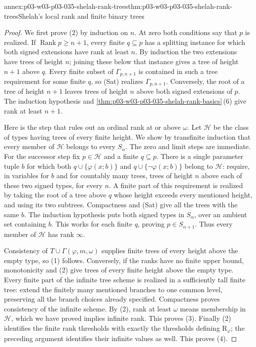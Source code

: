 \begin{annexitem}{annex:p03-w03-p03-035-shelah-rank-trees}{thm:p03-w03-p03-035-shelah-rank-trees}{Shelah's local rank and finite binary trees}
\begin{proof}
We first prove (2) by induction on \(n\).  At zero both conditions say
that \(p\) is realized.  If \(\operatorname{Rank}p\geq n+1\), every finite
\(q\subseteq p\) has a splitting instance for which both signed
extensions have rank at least \(n\).  By induction the two extensions have
trees of height \(n\); joining these below that instance gives a tree of
height \(n+1\) above \(q\).  Every finite subset of \(\Gamma_{p,n+1}\) is
contained in such a tree requirement for some finite \(q\), so (Sat)
realizes \(\Gamma_{p,n+1}\).  Conversely, the root of a tree of height
\(n+1\) leaves trees of height \(n\) above both signed extensions of
\(p\).  The induction hypothesis and
\cref{thm:p03-w03-p03-035-shelah-rank-basics}\,(6) give rank at least
\(n+1\).

Here is the step that rules out an ordinal rank at or above \(\omega\).
Let \(\mathcal H\) be the class of types having trees of every finite
height.  We show by transfinite induction that every member of
\(\mathcal H\) belongs to every \(S_\alpha\).  The zero and limit steps
are immediate.  For the successor step fix \(p\in\mathcal H\) and a
finite \(q\subseteq p\).  There is a single parameter tuple \(b\) for
which both \(q\cup\{\varphi(x;b)\}\) and
\(q\cup\{\neg\varphi(x;b)\}\) belong to \(\mathcal H\): require, in
variables for \(b\) and for countably many trees, trees of height \(n\)
above each of these two signed types, for every \(n\).  A finite part of
this requirement is realized by taking the root of a tree above \(q\)
whose height exceeds every mentioned height, and using its two subtrees.
Compactness and (Sat) give all the trees with the same \(b\).  The
induction hypothesis puts both signed types in \(S_\alpha\), over an
ambient set containing \(b\).  This works for each finite \(q\), proving
\(p\in S_{\alpha+1}\).  Thus every member of \(\mathcal H\) has rank
\(\infty\).

Consistency of \(T\cup\Gamma(\varphi,m,\omega)\) supplies finite trees
of every height above the empty type, so (1) follows.  Conversely, if the
ranks have no finite upper bound, monotonicity and (2) give trees of every
finite height above the empty type.  Every finite part of the infinite
tree scheme is realized in a sufficiently tall finite tree: extend the
finitely many mentioned branches to one common level, preserving all the
branch choices already specified.  Compactness proves consistency of the
infinite scheme.  By (2), rank at least \(\omega\) means membership in
\(\mathcal H\), which we have proved implies infinite rank.  This proves
(3).  Finally (2) identifies the finite rank thresholds with exactly the
thresholds defining \(\mathrm R_\varphi\); the preceding argument
identifies their infinite values as well.  This proves (4).
\end{proof}
\end{annexitem}

